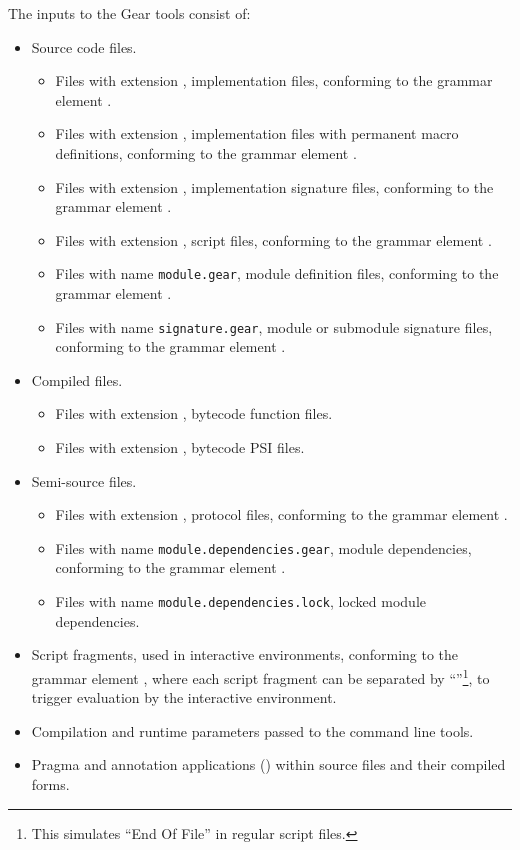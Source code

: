 The inputs to the Gear tools consist of: 
\begin{itemize}
  \item Source code files. 
    \begin{itemize}
      \item Files with extension , implementation files, conforming to the grammar element . 
      \item Files with extension , implementation files with permanent macro definitions, conforming to the grammar element . 
      \item Files with extension , implementation signature files, conforming to the grammar element . 
      \item Files with extension , script files, conforming to the grammar element . 
      \item Files with name \lstinline[deletekeywords={module}]!module.gear!, module definition files, conforming to the grammar element . 
      \item Files with name \lstinline[deletekeywords={signature}]!signature.gear!, module or submodule signature files, conforming to the grammar element . 
    \end{itemize}
  \item Compiled files. 
    \begin{itemize}
      \item Files with extension , bytecode function files. 
      \item Files with extension , bytecode PSI files. 
    \end{itemize}
  \item Semi-source files. 
    \begin{itemize}
      \item Files with extension , protocol files, conforming to the grammar element . 
      \item Files with name \lstinline[deletekeywords={module}]!module.dependencies.gear!, module dependencies, conforming to the grammar element . 
      \item Files with name \lstinline[deletekeywords={module}]!module.dependencies.lock!, locked module dependencies. 
    \end{itemize}
  \item Script fragments, used in interactive environments, conforming to the grammar element , where each script fragment can be separated by ``\code{;;}''\footnote{This simulates ``End Of File'' in regular script files.}, to trigger evaluation by the interactive environment. 
  \item Compilation and runtime parameters passed to the command line tools. 
  \item Pragma and annotation applications () within source files and their compiled forms. 
\end{itemize}

